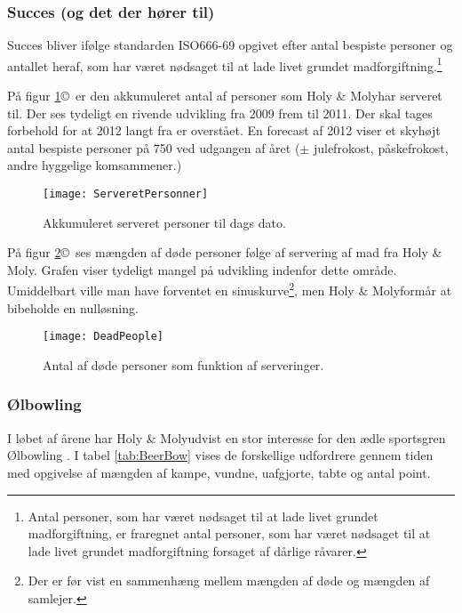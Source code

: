 \subsubsection{Succes (og det der hører til)}
Succes bliver ifølge standarden ISO666-69 opgivet efter antal bespiste personer og antallet heraf, som har været nødsaget til at lade livet grundet madforgiftning.\footnote{Antal personer, som har været nødsaget til at lade livet grundet madforgiftning, er fraregnet antal personer, som har været nødsaget til at lade livet grundet madforgiftning forsaget af dårlige råvarer. } 

På figur \ref{fig:ServeretPersonner}\copyright \,  er den akkumuleret antal af personer som Holy \& Moly\texttrademark har serveret til. Der ses tydeligt en rivende udvikling fra 2009 frem til 2011. Der skal tages forbehold for at 2012 langt fra er overstået. En forecast af 2012 viser et skyhøjt antal bespiste personer på 750 ved udgangen af året ($\pm$ julefrokost, påskefrokost, andre hyggelige komsammener.)

\begin{figure}[h!]
\centering
\texttt{[image: ServeretPersonner]}
\caption{Akkumuleret serveret personer til dags dato.}
\label{fig:ServeretPersonner}
\end{figure}

På figur \ref{fig:DeadPeople}\copyright \, ses mængden af døde personer følge af servering af mad fra Holy \& Moly\texttrademark. Grafen viser tydeligt mangel på udvikling indenfor dette område. Umiddelbart ville man have forventet en sinuskurve\footnote{Der er før vist en sammenhæng mellem mængden af døde og mængden af samlejer.}, men Holy \& Moly\texttrademark formår at bibeholde en nulløsning. 

\begin{figure}[h!]
\centering
\texttt{[image: DeadPeople]}
\caption{Antal af døde personer som funktion af serveringer.}
\label{fig:DeadPeople}
\end{figure}

\subsubsection{Ølbowling}
I løbet af årene har Holy \& Moly\texttrademark udvist en stor interesse for den ædle sportsgren Ølbowling \cite{bib:url:BeerBow}. I tabel \ref{tab:BeerBow} vises de forskellige udfordrere gennem tiden med opgivelse af mængden af kampe, vundne, uafgjorte, tabte og antal point. 


